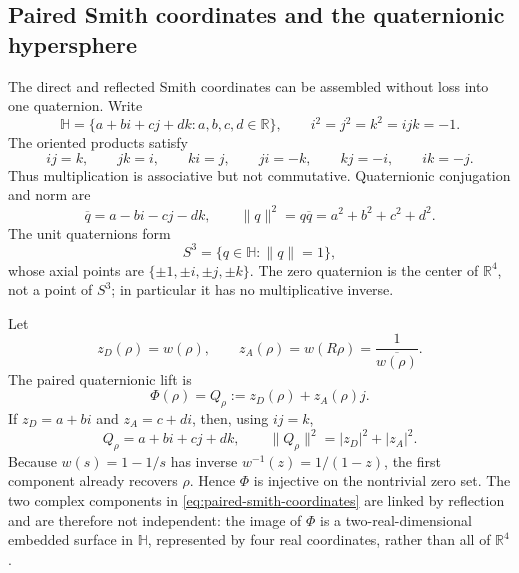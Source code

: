 \documentclass[11pt]{amsart}
\theoremstyle{definition}
\theoremstyle{remark}
\begin{document}
\subsection{Paired Smith coordinates and the quaternionic hypersphere}
\label{subsec:quaternion-smith}
The direct and reflected Smith coordinates can be assembled without loss into one quaternion.
Write
\begin{equation}\label{eq:quaternion-algebra}
 \mathbb H=\{a+bi+cj+dk:a,b,c,d\in\mathbb R\},
 \qquad i^2=j^2=k^2=ijk=-1.
\end{equation}
The oriented products satisfy
\begin{equation}\label{eq:quaternion-products}
 ij=k,\qquad jk=i,\qquad ki=j,
 \qquad ji=-k,\qquad kj=-i,\qquad ik=-j.
\end{equation}
Thus multiplication is associative but not commutative.  Quaternionic conjugation and norm are
\begin{equation}\label{eq:quaternion-norm}
 \overline q=a-bi-cj-dk,
 \qquad
 \|q\|^2=q\overline q=a^2+b^2+c^2+d^2.
\end{equation}
The unit quaternions form
\begin{equation}\label{eq:S3-unit-quaternions}
 S^3=\{q\in\mathbb H:\|q\|=1\},
\end{equation}
whose axial points are $\{\pm1,\pm i,\pm j,\pm k\}$.  The zero quaternion is the center of
$\mathbb R^4$, not a point of $S^3$; in particular it has no multiplicative inverse.

Let
\begin{equation}\label{eq:paired-smith-coordinates}
 z_D(\rho)=w(\rho),\qquad
 z_A(\rho)=w(R\rho)=\frac{1}{\overline{w(\rho)}}.
\end{equation}
The paired quaternionic lift is
\begin{equation}\label{eq:quaternion-lift}
 \Phi(\rho)=Q_\rho:=z_D(\rho)+z_A(\rho)j.
\end{equation}
If $z_D=a+bi$ and $z_A=c+di$, then, using $ij=k$,
\begin{equation}\label{eq:quaternion-four-coordinates}
 Q_\rho=a+bi+cj+dk,
 \qquad
 \|Q_\rho\|^2=|z_D|^2+|z_A|^2.
\end{equation}
Because $w(s)=1-1/s$ has inverse $w^{-1}(z)=1/(1-z)$, the first component already recovers
$\rho$.  Hence $\Phi$ is injective on the nontrivial zero set.  The two complex components in
\eqref{eq:paired-smith-coordinates} are linked by reflection and are therefore not independent:
the image of $\Phi$ is a two-real-dimensional embedded surface in $\mathbb H$, represented by
four real coordinates, rather than all of $\mathbb R^4$.
\end{document}
